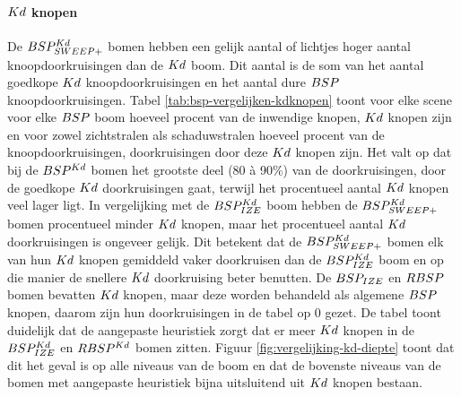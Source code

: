 \paragraph{$Kd$ knopen}
De $BSP^{Kd}_{SWEEP+}$ bomen hebben een gelijk aantal of lichtjes hoger aantal knoopdoorkruisingen dan de $Kd$ boom. Dit aantal is de som van het aantal goedkope $Kd$ knoopdoorkruisingen en het aantal dure $BSP$ knoopdoorkruisingen. Tabel \ref{tab:bsp-vergelijken-kdknopen} toont voor elke scene voor elke $BSP$ boom hoeveel procent van de inwendige knopen, $Kd$ knopen zijn en voor zowel zichtstralen als schaduwstralen hoeveel procent van de knoopdoorkruisingen, doorkruisingen door deze $Kd$ knopen zijn. Het valt op dat bij de $BSP^{Kd}$ bomen het grootste deel (80 à 90\%) van de doorkruisingen, door de goedkope $Kd$ doorkruisingen gaat, terwijl het procentueel aantal $Kd$ knopen veel lager ligt. In vergelijking met de $BSP^{Kd}_{IZE}$ boom hebben de $BSP^{Kd}_{SWEEP+}$ bomen procentueel minder $Kd$ knopen, maar het procentueel aantal $Kd$ doorkruisingen is ongeveer gelijk.
Dit betekent dat de $BSP^{Kd}_{SWEEP+}$ bomen elk van hun $Kd$ knopen gemiddeld vaker doorkruisen dan de $BSP^{Kd}_{IZE}$ boom en op die manier de snellere $Kd$ doorkruising beter benutten.
De $BSP_{IZE}$ en $RBSP$ bomen bevatten $Kd$ knopen, maar deze worden behandeld als algemene $BSP$ knopen, daarom zijn hun doorkruisingen in de tabel op 0 gezet. De tabel toont duidelijk dat de aangepaste heuristiek zorgt dat er meer $Kd$ knopen in de $BSP^{Kd}_{IZE}$ en $RBSP^{Kd}$ bomen zitten. Figuur \ref{fig:vergelijking-kd-diepte} toont dat dit het geval is op alle niveaus van de boom en dat de bovenste niveaus van de bomen met aangepaste heuristiek bijna uitsluitend uit $Kd$ knopen bestaan.

